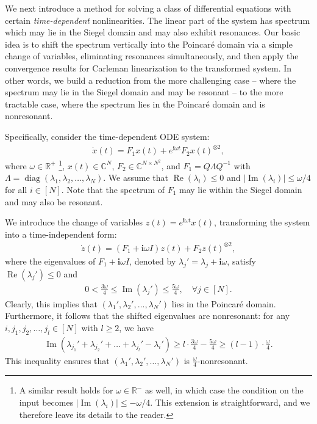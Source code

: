 \documentclass[superscriptaddress,onecolumn,nofootinbib,longbibliography,a4paper,accepted=2026-09-29]{quantumarticle}
\theoremstyle{plain}
\theoremstyle{definition}
\numberwithin{thm}{section}
\numberwithin{assumption}{section}
\numberwithin{lemma}{section}
\numberwithin{prop}{section}
\numberwithin{cor}{section}
\numberwithin{definition}{section}
\numberwithin{rmk}{section}
\numberwithin{equation}{section}
\newcommand{\lrb}[1]{\left ( #1 \right )}
\renewcommand{\i}{\ensuremath{\mathbf{i}}}
\newcommand{\realpart}[1]{\operatorname{Re}\lrb{#1}}
\newcommand{\imaginarypart}[1]{\operatorname{Im}\lrb{#1}}
\begin{document}
We next introduce a method for solving a class of differential equations with certain \emph{time-dependent} nonlinearities. The linear part of the system has spectrum which may lie in the Siegel domain and may also exhibit resonances. Our basic idea is to shift the spectrum vertically into the Poincar\'{e} domain via a simple change of variables, eliminating resonances simultaneously, and then apply the convergence results for Carleman linearization to the transformed system. In other words, we build a reduction from the more challenging case -- where the spectrum may lie in the Siegel domain and may be resonant -- to the more tractable case, where the spectrum lies in the Poincar\'{e} domain and is nonresonant. 

Specifically, consider the time-dependent ODE system: 
\begin{align}
\dot{x}(t) = F_1 x(t) + e^{\i \omega t} F_2 x(t)^{\otimes 2},  
\label{eq:original_ode_system_time_dependent}
\end{align}
where $\omega \in \mathbb{R}^+$ \footnote{A similar result holds for $\omega \in \mathbb{R}^-$ as well, in which case the condition on the input becomes $|\operatorname{Im}(\lambda_i)| \le -\omega/4$. This extension is straightforward, and we therefore leave its details to the reader.}, $x(t) \in \mathbb{C}^N$, $F_2 \in \mathbb{C}^{N \times N^2}$, and $F_1 = Q \Lambda Q^{-1}$ with $\Lambda = \operatorname{diag}(\lambda_1, \lambda_2, \dots, \lambda_N)$. We assume that $\operatorname{Re}(\lambda_i) \le 0$ and $|\operatorname{Im}(\lambda_i)| \le \omega/4$ for all $i \in [N]$. Note that the spectrum of $F_1$ may lie within the Siegel domain and may also be resonant.

We introduce the change of variables \( z(t) = e^{\i \omega t} x(t) \),  transforming the system into a time-independent form:
\begin{align}
    \dot{z}(t) = (F_1 + \i \omega I) z(t) + F_2  z(t)^{\otimes 2},
\label{eq:transformed_ode_system_time_independent}
\end{align}
where the eigenvalues of \( F_1 + \i \omega I \), denoted by \( \lambda_j' = \lambda_j + \i \omega \), satisfy \( \realpart{\lambda_j'} \le 0 \) and
\begin{align}
0 < \frac{3 \omega}{4} \le \imaginarypart{\lambda_j'} \le \frac{5 \omega}{4}, \quad \forall j \in [N].
\end{align}
Clearly, this implies that \( (\lambda_1', \lambda_2', \dots, \lambda_N') \) lies in the Poincar\'{e} domain. Furthermore, it follows that the shifted eigenvalues are nonresonant: for any \( i, j_1, j_2, \dots, j_l \in [N] \) with \( l \ge 2 \), we have
\begin{align}
\imaginarypart{\lambda_{j_1}' + \lambda_{j_2}' + \dots + \lambda_{j_l}'-\lambda_i'}
\ge l \cdot \frac{3 \omega}{4} - \frac{5 \omega}{4}
\ge (l - 1) \cdot \frac{\omega}{4}.
\end{align}
This inequality ensures that $( \lambda_1', \lambda_2', \dots, \lambda_N')$ is $\frac{\omega}{4}$-nonresonant.
\end{document}

